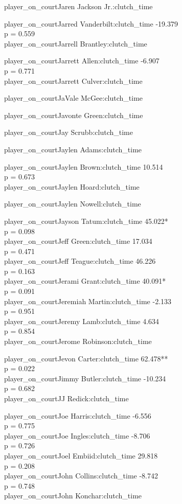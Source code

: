 \documentclass[
  landscape]{article}
\begin{document}
player\_on\_courtJaren Jackson Jr.:clutch\_time

player\_on\_courtJarred Vanderbilt:clutch\_time -19.379\\
p = 0.559\\
player\_on\_courtJarrell Brantley:clutch\_time

player\_on\_courtJarrett Allen:clutch\_time -6.907\\
p = 0.771\\
player\_on\_courtJarrett Culver:clutch\_time

player\_on\_courtJaVale McGee:clutch\_time

player\_on\_courtJavonte Green:clutch\_time

player\_on\_courtJay Scrubb:clutch\_time

player\_on\_courtJaylen Adams:clutch\_time

player\_on\_courtJaylen Brown:clutch\_time 10.514\\
p = 0.673\\
player\_on\_courtJaylen Hoard:clutch\_time

player\_on\_courtJaylen Nowell:clutch\_time

player\_on\_courtJayson Tatum:clutch\_time 45.022*\\
p = 0.098\\
player\_on\_courtJeff Green:clutch\_time 17.034\\
p = 0.471\\
player\_on\_courtJeff Teague:clutch\_time 46.226\\
p = 0.163\\
player\_on\_courtJerami Grant:clutch\_time 40.091*\\
p = 0.091\\
player\_on\_courtJeremiah Martin:clutch\_time -2.133\\
p = 0.951\\
player\_on\_courtJeremy Lamb:clutch\_time 4.634\\
p = 0.854\\
player\_on\_courtJerome Robinson:clutch\_time

player\_on\_courtJevon Carter:clutch\_time 62.478**\\
p = 0.022\\
player\_on\_courtJimmy Butler:clutch\_time -10.234\\
p = 0.682\\
player\_on\_courtJJ Redick:clutch\_time

player\_on\_courtJoe Harris:clutch\_time -6.556\\
p = 0.775\\
player\_on\_courtJoe Ingles:clutch\_time -8.706\\
p = 0.726\\
player\_on\_courtJoel Embiid:clutch\_time 29.818\\
p = 0.208\\
player\_on\_courtJohn Collins:clutch\_time -8.742\\
p = 0.748\\
player\_on\_courtJohn Konchar:clutch\_time
\end{document}
